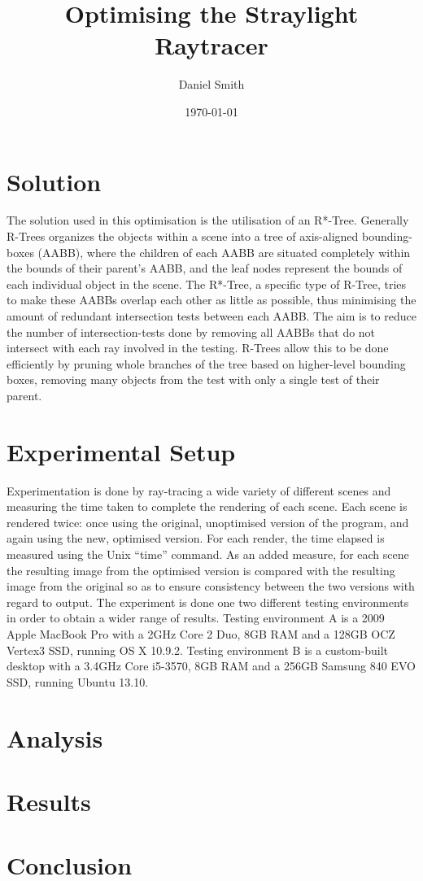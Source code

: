 \documentclass[a4paper]{article}
\title{Optimising the Straylight Raytracer}
\author{Daniel Smith}
\date{\today}
\begin{document}
\maketitle

\section{Solution}
The solution used in this optimisation is the utilisation of an R*-Tree. Generally R-Trees organizes the objects within a scene into a tree of axis-aligned bounding-boxes (AABB), where the children of each AABB are situated completely within the bounds of their parent's AABB, and the leaf nodes represent the bounds of each individual object in the scene. The R*-Tree, a specific type of R-Tree, tries to make these AABBs overlap each other as little as possible, thus minimising the amount of redundant intersection tests between each AABB. The aim is to reduce the number of intersection-tests done by removing all AABBs that do not intersect with each ray involved in the testing. R-Trees allow this to be done efficiently by pruning whole branches of the tree based on higher-level bounding boxes, removing many objects from the test with only a single test of their parent.

\section{Experimental Setup}
Experimentation is done by ray-tracing a wide variety of different scenes and measuring the time taken to complete the rendering of each scene. Each scene is rendered twice: once using the original, unoptimised version of the program, and again using the new, optimised version. For each render, the time elapsed is measured using the Unix ``time'' command. As an added measure, for each scene the resulting image from the optimised version is compared with the resulting image from the original so as to ensure consistency between the two versions with regard to output. The experiment is done one two different testing environments in order to obtain a wider range of results. Testing environment A is a 2009 Apple MacBook Pro with a 2GHz Core 2 Duo, 8GB RAM and a 128GB OCZ Vertex3 SSD, running OS X 10.9.2. Testing environment B is a custom-built desktop with a 3.4GHz Core i5-3570, 8GB RAM and a 256GB Samsung 840 EVO SSD, running Ubuntu 13.10.

\section{Analysis}

\section{Results}

\section{Conclusion}
\end{document}
